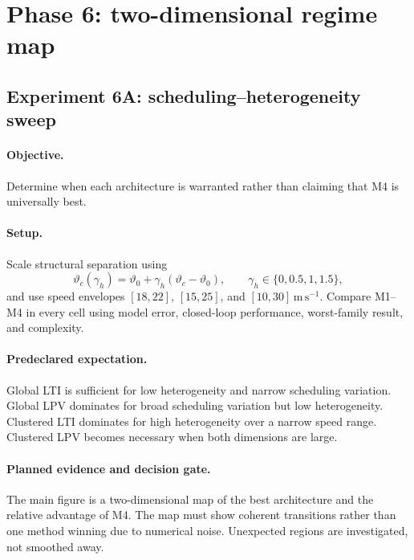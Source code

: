 \section{Phase 6: two-dimensional regime map}
\label{sec:phase6}

\subsection{Experiment 6A: scheduling--heterogeneity sweep}
\label{sec:experiment6a}
\paragraph{Objective.}
Determine when each architecture is warranted rather than claiming that M4 is
universally best.

\paragraph{Setup.}
Scale structural separation using
\begin{equation}
 \vartheta_c(\gamma_h)=\vartheta_0+\gamma_h(\vartheta_c-\vartheta_0),
 \qquad \gamma_h\in\{0,0.5,1,1.5\},
\end{equation}
and use speed envelopes
$[18,22]$, $[15,25]$, and $[10,30]\,\mathrm{m\,s^{-1}}$. Compare M1--M4 in every
cell using model error, closed-loop performance, worst-family result, and
complexity.

\paragraph{Predeclared expectation.}
Global LTI is sufficient for low heterogeneity and narrow scheduling variation.
Global LPV dominates for broad scheduling variation but low heterogeneity.
Clustered LTI dominates for high heterogeneity over a narrow speed range. Clustered
LPV becomes necessary when both dimensions are large.

\paragraph{Planned evidence and decision gate.}
The main figure is a two-dimensional map of the best architecture and the relative
advantage of M4. The map must show coherent transitions rather than one method
winning due to numerical noise. Unexpected regions are investigated, not smoothed
away.

